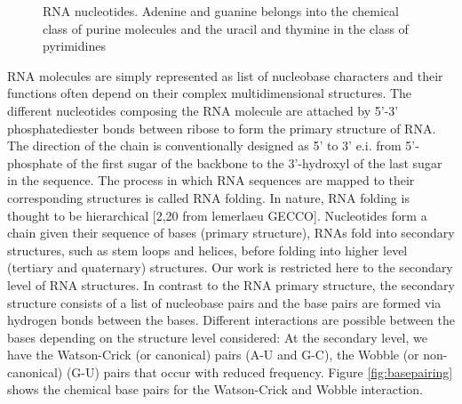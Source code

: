 \begin{figure}
\begin{minipage}[b]{.5\linewidth}
		\label{fig:cytosine}
	\end{minipage}%
	\begin{minipage}[b]{.5\linewidth}
		\centering 
		
		\label{fig:guanine}
	\end{minipage}%
	
	
	\caption{RNA nucleotides. Adenine and guanine belongs into the chemical class of purine molecules and the uracil and thymine in the class of pyrimidines}\label{fig:nucleotide}
\end{figure}
RNA molecules are simply represented as list of nucleobase characters and their functions often depend on their complex multidimensional structures. The different nucleotides composing the RNA molecule are attached by 5'-3' phosphatediester bonds between ribose to form the primary structure of RNA. The direction of the chain is conventionally designed as 5' to 3' e.i. from 5'-phosphate of the first sugar of the backbone to the 3'-hydroxyl of the last sugar in the sequence.  The process in which RNA sequences are mapped to their corresponding structures is called RNA folding. In nature, RNA folding is thought to be hierarchical [2,20 from lemerlaeu GECCO]. Nucleotides form a chain given their sequence of bases (primary structure), RNAs fold into secondary structures, such as stem loops and helices, before folding into higher level (tertiary and quaternary) structures. Our work is restricted here to the secondary level of RNA structures. In contrast to the RNA primary structure, the secondary structure consists of a list of nucleobase pairs and the base pairs are formed via hydrogen bonds between the bases.  Different interactions are possible between the bases depending on the structure level considered: At the secondary level, we have the Watson-Crick (or canonical) pairs \cite{seeman1976rna, rosenberg1976rna} (A-U and G-C), the Wobble (or  non-canonical) (G-U) pairs that occur with reduced frequency. Figure \ref{fig:basepairing} shows the chemical base pairs for the Watson-Crick and Wobble interaction. 


